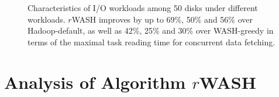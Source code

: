 \documentclass[conference]{IEEEtran}
\begin{document}
\begin{figure}[!t]
	\centering
	\quad\quad %
	\quad\quad
	\vspace{-1ex}
	\caption{Characteristics of I/O workloads among 50 disks under different workloads. $r$WASH improves by up to 69\%, 50\% and 56\% over Hadoop-default, as well as 42\%, 25\% and 30\% over WASH-greedy in terms of the maximal task reading time for concurrent data fetching.}
	\label{Fig:instance}
\end{figure}
\section{Analysis of Algorithm $r$WASH}\label{Analysis}
\end{document}

